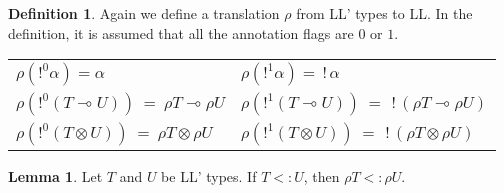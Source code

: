 \documentclass[9pt]{article}
\theoremstyle{plain}
\theoremstyle{definition}
\newtheorem{defn}{Definition}[subsection] %
\newtheorem{lemma}{Lemma}[section]
\def\bang{\,!\,}
\begin{document}
\begin{defn} Again we define a translation $\rho$ from LL' types to LL.
	In the definition, it is assumed that all the annotation flags are $0$ or $1$.
  \begin{center}
	\begin{tabular}{ll}
		$\rho (!^0 \alpha) = \alpha $ & $\rho (!^1 \alpha) = \bang \alpha$ \\
		$\rho (!^0 (T \multimap U)) ~=~ \rho T \multimap \rho U$ & $\rho (!^1(T \multimap U)) ~=~ \bang (\rho T \multimap \rho U)$ \\
		$\rho (!^0 (T \otimes U)) ~=~ \rho T \otimes \rho U$ & $\rho (!^1(T \otimes U)) ~=~ \bang (\rho T \otimes \rho U)$ 
	\end{tabular}
	\end{center}
\end{defn}

\begin{lemma}
	\label{subLL'=>subLL}
	Let $T$ and $U$ be LL' types. If $T <: U$, then $\rho T <: \rho U$.
\end{lemma}
\end{document}
